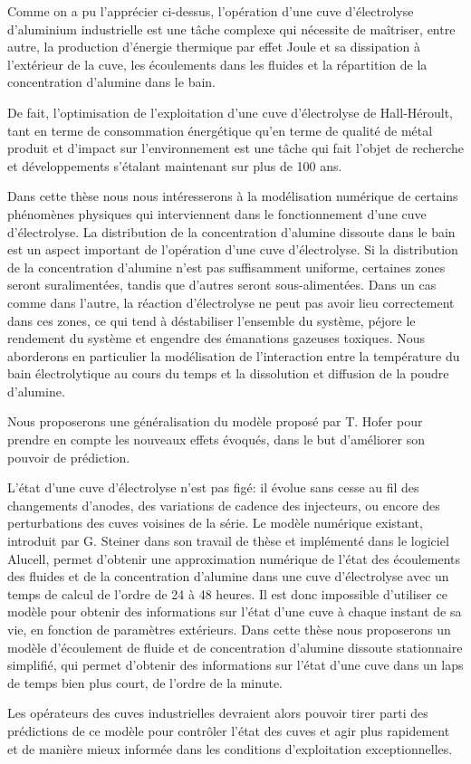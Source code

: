 Comme on a pu l'apprécier ci-dessus, l'opération d'une cuve
d'électrolyse d'aluminium industrielle est une tâche complexe qui
nécessite de maîtriser, entre autre, la production d'énergie thermique
par effet Joule et sa dissipation à l'extérieur de la cuve, les
écoulements dans les fluides et la répartition de la concentration
d'alumine dans le bain.

De fait, l'optimisation de l'exploitation d'une cuve d'électrolyse de
Hall-Héroult, tant en terme de consommation énergétique qu'en terme de
qualité de métal produit et d'impact sur l'environnement est une tâche
qui fait l'objet de recherche et développements s'étalant maintenant
sur plus de 100 ans.

Dans cette thèse nous nous intéresserons à la modélisation numérique
de certains phénomènes physiques qui interviennent dans le
fonctionnement d'une cuve d'électrolyse. La distribution de la
concentration d'alumine dissoute dans le bain est un aspect important
de l'opération d'une cuve d'électrolyse. Si la distribution de la
concentration d'alumine n'est pas suffisamment uniforme, certaines
zones seront suralimentées, tandis que d'autres seront
sous-alimentées. Dans un cas comme dans l'autre, la réaction
d'électrolyse ne peut pas avoir lieu correctement dans ces zones, ce
qui tend à déstabiliser l'ensemble du système, péjore le rendement du
système et engendre des émanations gazeuses toxiques. Nous aborderons
en particulier la modélisation de l'interaction entre la température
du bain électrolytique au cours du temps et la dissolution et
diffusion de la poudre d'alumine.

Nous proposerons une généralisation du modèle proposé par
T. Hofer \cite{Hofer2011} pour prendre en compte les nouveaux effets
évoqués, dans le but d'améliorer son pouvoir de prédiction.

L'état d'une cuve d'électrolyse n'est pas figé: il évolue sans cesse
au fil des changements d'anodes, des variations de cadence des
injecteurs, ou encore des perturbations des cuves voisines de la
série. Le modèle numérique existant, introduit par G. Steiner dans son
travail de thèse \cite{Steiner2009} et implémenté dans le logiciel
Alucell, permet d'obtenir une approximation numérique de l'état des
écoulements des fluides et de la concentration d'alumine dans une cuve
d'électrolyse avec un temps de calcul de l'ordre de \num{24} à
\num{48} heures. Il est donc impossible d'utiliser ce modèle pour
obtenir des informations sur l'état d'une cuve à chaque instant de sa
vie, en fonction de paramètres extérieurs. Dans cette thèse nous
proposerons un modèle d'écoulement de fluide et de concentration
d'alumine dissoute stationnaire simplifié, qui permet d'obtenir des
informations sur l'état d'une cuve dans un laps de temps bien plus
court, de l'ordre de la minute.

Les opérateurs des cuves industrielles devraient alors pouvoir tirer
parti des prédictions de ce modèle pour contrôler l'état des cuves
et agir plus rapidement et de manière mieux informée dans les
conditions d'exploitation exceptionnelles.
